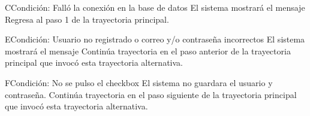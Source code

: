 	\begin{UCtrayectoriaA}{C}{Condición: Falló la conexión en la base de datos}
		\UCpaso[\UCsist] El sistema mostrará el mensaje 
		\UCpaso[\UCsist] Regresa al paso 1 de la trayectoria principal. 
	\end{UCtrayectoriaA}
	\begin{UCtrayectoriaA}{E}{Condición: Usuario no registrado o correo y/o contraseña incorrectos}
		\UCpaso[\UCsist] El sistema mostrará el mensaje 
		\UCpaso[\UCsist] Continúa trayectoria en el paso anterior de la trayectoria principal que invocó esta trayectoria alternativa. 
	\end{UCtrayectoriaA}
	\begin{UCtrayectoriaA}{F}{Condición: No se pulso el checkbox}
		\UCpaso[\UCsist] El sistema no guardara el usuario y contraseña.
		\UCpaso[\UCsist] Continúa trayectoria en el paso siguiente de la trayectoria principal que invocó esta trayectoria alternativa. 
	\end{UCtrayectoriaA}
